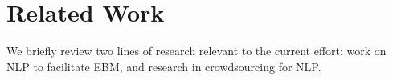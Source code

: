 \documentclass[11pt,a4paper]{article}
\begin{document}





\section{Related Work}
\label{section:related-work}

We briefly review two lines of research relevant to the current effort: work on NLP to facilitate EBM, and research in crowdsourcing for NLP. 

\end{document}
